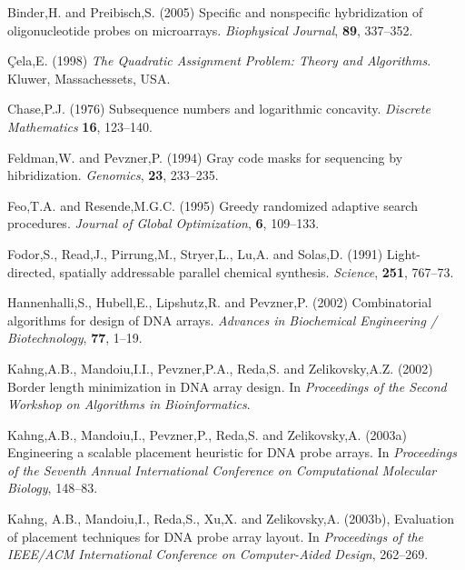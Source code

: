 \documentclass{bioinfo}
\begin{document}
\begin{thebibliography}{}

 Binder,H. and Preibisch,S. (2005) Specific and nonspecific hybridization of oligonucleotide probes on microarrays. {\it Biophysical Journal}, {\bf 89}, 337--352.

 \c{C}ela,E. (1998) {\it The Quadratic Assignment Problem: Theory and Algorithms}. Kluwer, Massachessets, USA.

 Chase,P.J. (1976) Subsequence numbers and logarithmic concavity. {\it Discrete Mathematics} {\bf 16}, 123--140.

 Feldman,W. and Pevzner,P. (1994) Gray code masks for sequencing by hibridization. {\it Genomics}, {\bf 23}, 233--235.

 Feo,T.A. and Resende,M.G.C. (1995) Greedy randomized adaptive search procedures. {\it Journal of Global Optimization}, {\bf 6}, 109--133.

 Fodor,S., Read,J., Pirrung,M., Stryer,L., Lu,A. and Solas,D. (1991) Light-directed, spatially addressable parallel chemical synthesis. {\it Science}, {\bf 251}, 767--73.

 Hannenhalli,S., Hubell,E., Lipshutz,R. and Pevzner,P. (2002) Combinatorial algorithms for design of DNA arrays. {\it Advances in Biochemical Engineering / Biotechnology}, {\bf 77}, 1--19.

 Kahng,A.B., Mandoiu,I.I., Pevzner,P.A., Reda,S. and Zelikovsky,A.Z. (2002) Border length minimization in DNA array design. In {\it Proceedings of the Second Workshop on Algorithms in Bioinformatics}.

 Kahng,A.B., Mandoiu,I., Pevzner,P., Reda,S. and Zelikovsky,A. (2003a) Engineering a scalable placement heuristic for DNA probe arrays. In {\it Proceedings of the Seventh Annual International Conference on Computational Molecular Biology}, 148--83.

 Kahng, A.B., Mandoiu,I., Reda,S., Xu,X. and Zelikovsky,A. (2003b), Evaluation of placement techniques for DNA probe array layout. In {\it Proceedings of the IEEE/ACM International Conference on Computer-Aided Design}, 262--269.


\end{thebibliography}
\end{document}
